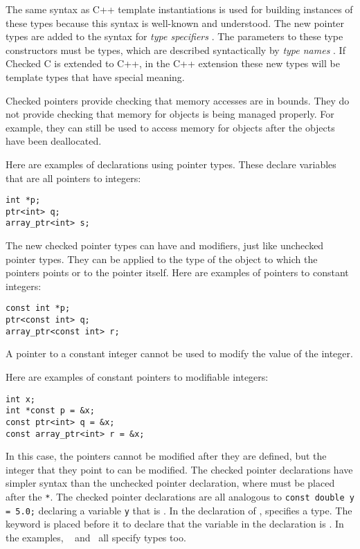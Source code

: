 The same syntax as C++ template instantiations is used for building
instances of these types because this syntax is well-known and
understood.  The new pointer types are added to the syntax for {\it type specifiers}
\cite[Section 6.7.2]{ISO2011}. The parameters to these type constructors
must be types, which are described syntactically by {\it type names}
\cite[Section 6.7.7]{ISO2011}.  If Checked C is extended to C++,
in the C++ extension these new types will be template types that have special meaning.

Checked pointers provide checking that memory accesses are in bounds.  They
do not provide checking that memory for objects is being managed
properly. For example, they can still be used to access memory for objects after
the objects have been deallocated.

Here are  examples of declarations using pointer types.   These declare variables that
are all pointers to integers:
\begin{lstlisting}
int *p;
ptr<int> q;
array_ptr<int> s;
\end{lstlisting}

The new checked pointer types can have  and 
modifiers, just like unchecked pointer types.   They can be applied to the type
of the object to which the pointers points or to the pointer itself.  Here are examples
of pointers to constant integers:
\begin{lstlisting}
const int *p;
ptr<const int> q;
array_ptr<const int> r;
\end{lstlisting}
A pointer to a constant integer cannot be used to modify the value of
the integer.

Here are examples of constant pointers to modifiable integers:
\begin{lstlisting}
int x;
int *const p = &x;
const ptr<int> q = &x;
const array_ptr<int> r = &x;
\end{lstlisting}
In this case, the pointers cannot be modified after they are defined, but
the integer that they point to can be modified.   The checked pointer declarations
have simpler syntax than the unchecked pointer declaration, where 
must be placed after the \lstinline+*+.   The checked pointer declarations are all analogous
to \lstinline+const double y = 5.0;+ declaring a  variable \lstinline+y+ that is .
In the declaration of ,  specifies a type.
The  keyword is placed before it to declare that
the variable in the declaration is .  In the examples, \ptrint\ %
and \arrayptrint\ all specify types too.

